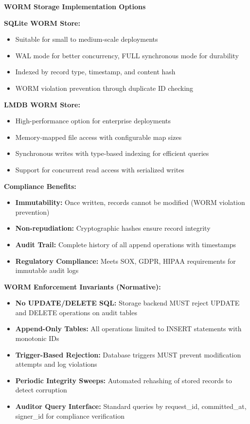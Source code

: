 \documentclass[12pt,a4paper]{article}
\begin{document}
\begin{technicalbox}
\textbf{WORM Storage Implementation Options}

\textbf{SQLite WORM Store:}
\begin{itemize}
\item Suitable for small to medium-scale deployments
\item WAL mode for better concurrency, FULL synchronous mode for durability
\item Indexed by record type, timestamp, and content hash
\item WORM violation prevention through duplicate ID checking
\end{itemize}

\textbf{LMDB WORM Store:}
\begin{itemize}
\item High-performance option for enterprise deployments
\item Memory-mapped file access with configurable map sizes
\item Synchronous writes with type-based indexing for efficient queries
\item Support for concurrent read access with serialized writes
\end{itemize}

\textbf{Compliance Benefits:}
\begin{itemize}
\item \textbf{Immutability:} Once written, records cannot be modified (WORM violation prevention)
\item \textbf{Non-repudiation:} Cryptographic hashes ensure record integrity
\item \textbf{Audit Trail:} Complete history of all append operations with timestamps
\item \textbf{Regulatory Compliance:} Meets SOX, GDPR, HIPAA requirements for immutable audit logs
\end{itemize}

\textbf{WORM Enforcement Invariants (Normative):}
\begin{itemize}
\item \textbf{No UPDATE/DELETE SQL:} Storage backend MUST reject UPDATE and DELETE operations on audit tables
\item \textbf{Append-Only Tables:} All operations limited to INSERT statements with monotonic IDs
\item \textbf{Trigger-Based Rejection:} Database triggers MUST prevent modification attempts and log violations
\item \textbf{Periodic Integrity Sweeps:} Automated rehashing of stored records to detect corruption
\item \textbf{Auditor Query Interface:} Standard queries by request\_id, committed\_at, signer\_id for compliance verification
\end{itemize}
\end{technicalbox}
\end{document}
